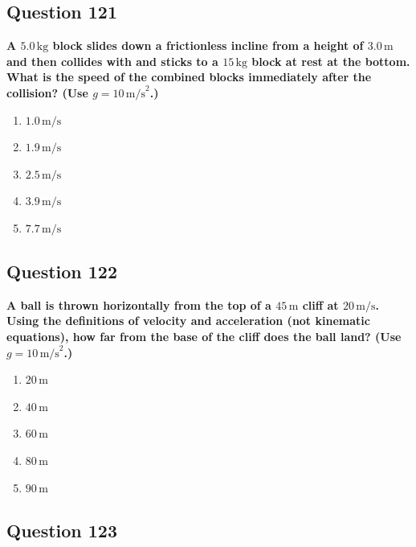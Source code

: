 \documentclass[12pt,letterpaper]{article}
\begin{document}
\subsection{Question 121}

\begin{questionbox}
\textbf{A $5.0\,\text{kg}$ block slides down a frictionless incline from a height of $3.0\,\text{m}$ and then collides with and sticks to a $15\,\text{kg}$ block at rest at the bottom. What is the speed of the combined blocks immediately after the collision? (Use $g = 10\,\text{m/s}^2$.)}

\begin{enumerate}[label=\alph*)]
    \item $1.0\,\text{m/s}$
    \item $1.9\,\text{m/s}$
    \item $2.5\,\text{m/s}$
    \item $3.9\,\text{m/s}$
    \item $7.7\,\text{m/s}$
\end{enumerate}
\end{questionbox}

\subsection{Question 122}

\begin{questionbox}
\textbf{A ball is thrown horizontally from the top of a $45\,\text{m}$ cliff at $20\,\text{m/s}$. Using the definitions of velocity and acceleration (not kinematic equations), how far from the base of the cliff does the ball land? (Use $g = 10\,\text{m/s}^2$.)}

\begin{enumerate}[label=\alph*)]
    \item $20\,\text{m}$
    \item $40\,\text{m}$
    \item $60\,\text{m}$
    \item $80\,\text{m}$
    \item $90\,\text{m}$
\end{enumerate}
\end{questionbox}

\subsection{Question 123}
\end{document}
